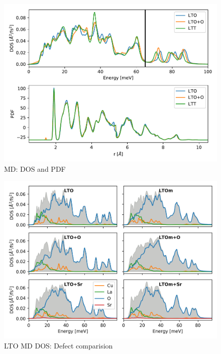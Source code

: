 \begin{figure}
	\centering
	\includegraphics[width=\textwidth]{fig/md/lto_ltt_ltoo_comparison.pdf}
	\caption[MD: DOS and PDF]{MD: DOS and PDF}
	\label{fig:dos_pdf}
\end{figure}

\begin{figure}[]
	\centering
	\includegraphics[width=\textwidth]{fig/md/lto_defect_comparison.png}
	\caption[LTO MD DOS: Defect comparision]{LTO MD DOS: Defect comparision}
	\label{fig:lto_md_defect_comparison}
\end{figure}


